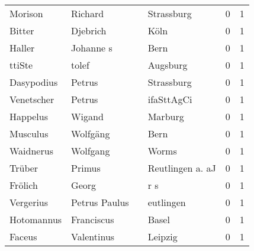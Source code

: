 \begin{tabular}{llllrr}
                  Morison &                            Richard &             &                                  Strassburg &          0 &         1 \\
                   Bitter &                           Djebrich &             &                                        Köln &          0 &         1 \\
                   Haller &                          Johanne s &             &                                        Bern &          0 &         1 \\
                   ttiSte &                              tolef &             &                                    Augsburg &          0 &         1 \\
               Dasypodius &                             Petrus &             &                                  Strassburg &          0 &         1 \\
               Venetscher &                             Petrus &             &                                  ifaSttAgCi &          0 &         1 \\
                 Happelus &                             Wigand &             &                                     Marburg &          0 &         1 \\
                 Musculus &                           Wolfgäng &             &                                        Bern &          0 &         1 \\
                Waidnerus &                           Wolfgang &             &                                       Worms &          0 &         1 \\
                   Trüber &                             Primus &             &                            Reutlingen a. aJ &          0 &         1 \\
                  Frölich &                              Georg &             &                                         r s &          0 &         1 \\
                Vergerius &                      Petrus Paulus &             &                                   eutlingen &          0 &         1 \\
               Hotomannus &                         Franciscus &             &                                       Basel &          0 &         1 \\
                   Faceus &                         Valentinus &             &                                     Leipzig &          0 &         1 \\

\end{tabular}
